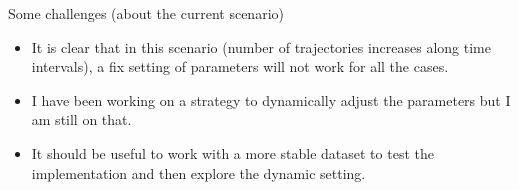 \documentclass{beamer}
\begin{document}
\begin{frame}{Some challenges (about the current scenario)}
    \begin{itemize}
        \item It is clear that in this scenario (number of trajectories increases along time intervals), a fix setting of parameters will not work for all the cases.
        \item I have been working on a strategy to dynamically adjust the parameters but I am still on that.
        \item It should be useful to work with a more stable dataset to test the implementation and then explore the dynamic setting.
    \end{itemize}
\end{frame}
\end{document}
